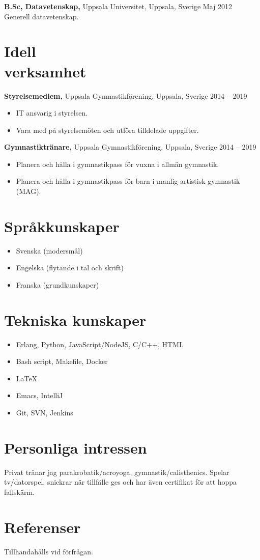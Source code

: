 \documentclass[margin]{res}
\begin{document}
\begin{resume}
{\bf B.Sc, Datavetenskap,} Uppsala Universitet, Uppsala, Sverige \hfill Maj 2012 \\
Generell datavetenskap.

\newpage
\section{Idell \\ verksamhet}

{\bf Styrelsemedlem,} Uppsala Gymnastikförening, Uppsala, Sverige \hfill 2014 -- 2019
\begin{itemize} \itemsep -2pt
\item IT ansvarig i styrelsen.
\item Vara med på styrelsemöten och utföra tilldelade uppgifter.
\end{itemize}

{\bf Gymnastiktränare,} Uppsala Gymnastikförening, Uppsala, Sverige \hfill 2014 -- 2019
\begin{itemize} \itemsep -2pt
\item Planera och hålla i gymnastikpass för vuxna i allmän gymnastik.
\item Planera och hålla i gymnastikpass för barn i manlig artistisk gymnastik (MAG).
\end{itemize}

\section{Språkkunskaper}
\begin{itemize} \itemsep -2pt
\item Svenska (modersmål)
\item Engelska (flytande i tal och skrift)
\item Franska (grundkunskaper)
\end{itemize}

\section{Tekniska kunskaper}
\begin{itemize} \itemsep -2pt
\item Erlang, Python, JavaScript/NodeJS, C/C++, HTML
\item Bash script, Makefile, Docker
\item LaTeX
\item Emacs, IntelliJ
\item Git, SVN, Jenkins
\end{itemize}

\section{Personliga intressen}
Privat tränar jag parakrobatik/acroyoga, gymnastik/calisthenics.
Spelar tv/datorspel, snickrar när tillfälle ges och har även certifikat för att hoppa fallskärm.

\section{Referenser}
Tillhandahålls vid förfrågan.

\end{resume}
\end{document}
